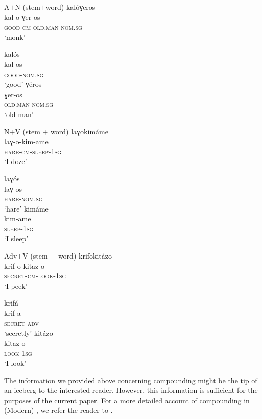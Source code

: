\documentclass[output=paper]{LSP/langsci}
\begin{document}
	\z
\z
\ea\label{ex:12} A$+$N (stem$+$word)
	\ea\label{ex:12a}
		\glll kalóɣeros\\
				kal-o-ɣer-os\\
				\textsc{good-cm-old.man-nom.sg}\\
		\glt	`monk'
\begin{multicols}{2}
	\ex\label{ex:12b}
		\glll	kalós\\
				kal-os\\
				\textsc{good-nom.sg}\\
		\glt	`good'
	\ex\label{ex:12c}
		\glll ɣéros\\
				ɣer-os\\
				\textsc{old.man-nom.sg}\\
		\glt	`old man'
\end{multicols}
	\z
\z
\ea\label{ex:13} N$+$V (stem $+$ word)
	\ea\label{ex:13a}
		\glll laɣokimáme\\
				laɣ-o-kim-ame\\
				\textsc{hare-cm-sleep-1sg}\\
		\glt	`I doze'
\begin{multicols}{2}
	\ex\label{ex:13b}
		\glll	laɣós\\
				laɣ-os\\
				\textsc{hare-nom.sg}\\
		\glt	`hare'
	\ex\label{ex:13c}
		\glll	kimáme\\
				kim-ame\\
				\textsc{sleep-1sg}\\
		\glt	`I sleep'
\end{multicols}
	\z
\z
\ea\label{ex:14} Adv$+$V (stem $+$ word)
	\ea\label{ex:14a}
		\glll krifokitázo\\
				krif-o-kitaz-o\\
				\textsc{secret-cm-look-1sg}\\
		\glt	`I peek'
\begin{multicols}{2}
	\ex\label{ex:14b}
		\glll	krifá\\
				krif-a\\
				\textsc{secret-adv}\\
		\glt	`secretly'
	\ex\label{ex:14c}
		\glll	kitázo\\
				kitaz-o\\
				\textsc{look-1sg}\\
		\glt	`I look'
\end{multicols}
	\z
\z
The information we provided above concerning  compounding might be the tip of an iceberg to the interested reader. However, this information is sufficient for the purposes of the current paper. For a more detailed account of compounding in (Modern) , we refer the reader to \citet{Ralli2013moderngreek}.
\end{document}
